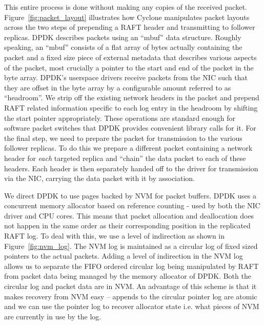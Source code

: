 \documentclass[twocolumn]{article}
\begin{document}
This entire process is done without making any copies of the received packet.
Figure~\ref{fig:packet_layout} illustrates how
Cyclone manipulates packet layouts across the two steps of prepending a RAFT
header and transmitting to follower replicas. DPDK describes packets using an
``mbuf'' data structure. Roughly speaking, an ``mbuf'' consists of a flat array
of bytes actually containing the packet and a fixed size piece of external
metadata that describes various aspects of the packet, most crucially a pointer
to the start and end of the packet in the byte array. DPDK's userspace drivers
receive packets from the NIC such that they are offset in the byte array by a
configurable amount referred to as ``headroom''. We strip off the existing
network headers in the packet and prepend RAFT related information specific to
each log entry in the headroom by shifting the start pointer appropriately.
These operations are standard enough for software packet switches that DPDK
provides convenient library calls for it. For the final step, we need to prepare
the packet for transmission to the various follower replicas. To do this we
prepare a different packet containing a network header for \emph{each}
targeted replica and ``chain'' the data packet to each of these headers. Each
header is then separately handed off to the driver for transmission via the NIC,
carrying the data packet with it by association.

We direct DPDK to use pages backed by NVM for packet buffers. DPDK uses a
concurrent memory allocator based on reference counting - used by both the NIC
driver and CPU cores. This means that packet allocation and deallocation does
not happen in the same order as their corresponding position in the replicated
RAFT log. To deal with this, we use a level of indirection as shown in
Figure~\ref{fig:nvm_log}. The NVM log is maintained as a circular log of fixed
sized pointers to the actual packets. Adding a level of indirection in the NVM
log allows us to separate the FIFO ordered circular log being manipulated by
RAFT from packet data being managed by the memory allocator of DPDK. Both the
circular log and packet data are in NVM. An advantage of this scheme is that it
makes recovery from NVM easy -- appends to the circular pointer log are atomic
and we can use the pointer log to recover allocator state i.e. what pieces of
NVM are currently in use by the log.
\end{document}
